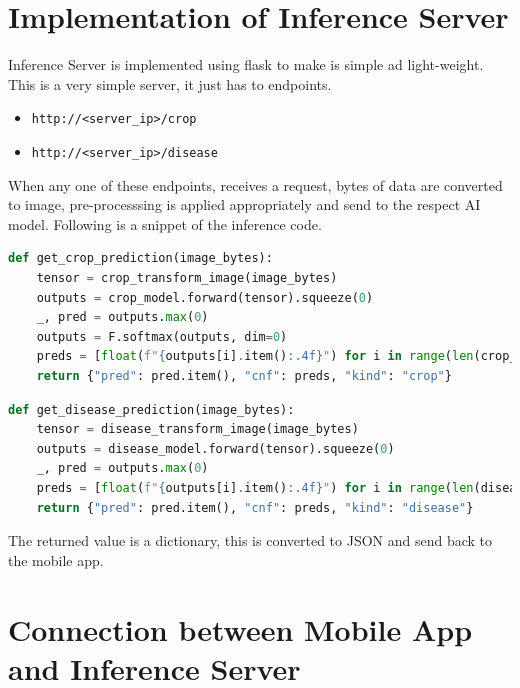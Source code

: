 \documentclass[../Report.tex]{subfiles}
\begin{document}
\begin{description}
\end{description}

\section{Implementation of Inference Server} \label{sec:inference_server}

Inference Server is implemented using flask to make is simple ad light-weight. This is a very simple server, it just has to endpoints.

\begin{itemize}
  \item \texttt{http://<server\_ip>/crop}
  \item \texttt{http://<server\_ip>/disease}
\end{itemize}

When any one of these endpoints, receives a request, bytes of data are converted to image, pre-processsing is applied appropriately 
and send to the respect AI model. Following is a snippet of the inference code.

\begin{lstlisting}[language=python,caption={Crop Inference Code},captionpos=b]
  def get_crop_prediction(image_bytes):
    tensor = crop_transform_image(image_bytes)
    outputs = crop_model.forward(tensor).squeeze(0)
    _, pred = outputs.max(0)
    outputs = F.softmax(outputs, dim=0)
    preds = [float(f"{outputs[i].item():.4f}") for i in range(len(crop_class_names))]
    return {"pred": pred.item(), "cnf": preds, "kind": "crop"}
\end{lstlisting}

\begin{lstlisting}[language=python,caption={Crop Inference Code},captionpos=b]
  def get_disease_prediction(image_bytes):
    tensor = disease_transform_image(image_bytes)
    outputs = disease_model.forward(tensor).squeeze(0)
    _, pred = outputs.max(0)
    preds = [float(f"{outputs[i].item():.4f}") for i in range(len(diseases_class_names))]
    return {"pred": pred.item(), "cnf": preds, "kind": "disease"}
\end{lstlisting}

The returned value is a dictionary, this is converted to JSON and send back to the mobile app.

\section{Connection between Mobile App and Inference Server}
\end{document}
